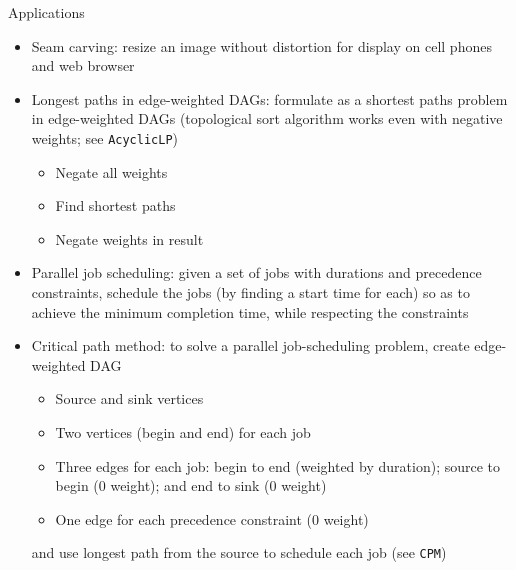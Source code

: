\documentclass[8pt,a4paper,compress]{beamer}
\begin{document}
\begin{frame}[fragile]
Applications
\begin{itemize}
\item Seam carving: resize an image without distortion for display on cell phones and web browser

\item Longest paths in edge-weighted DAGs: formulate as a shortest paths problem in edge-weighted DAGs (topological sort algorithm works even with negative weights; see \lstinline{AcyclicLP})
\begin{itemize}
\item Negate all weights

\item Find shortest paths

\item Negate weights in result
\end{itemize}


\item Parallel job scheduling: given a set of jobs with durations and precedence constraints, schedule the jobs (by finding a start time for each) so as to achieve the minimum completion time, while respecting the constraints

\item Critical path method: to solve a parallel job-scheduling problem, create edge-weighted DAG
\begin{itemize}
\item Source and sink vertices
\item Two vertices (begin and end) for each job
\item Three edges for each job: begin to end (weighted by duration); source to begin (0 weight); and end to sink (0 weight)
\item One edge for each precedence constraint (0 weight)
\end{itemize}
and use longest path from the source to schedule each job (see \lstinline{CPM})
\end{itemize}
\end{frame}
\end{document}

